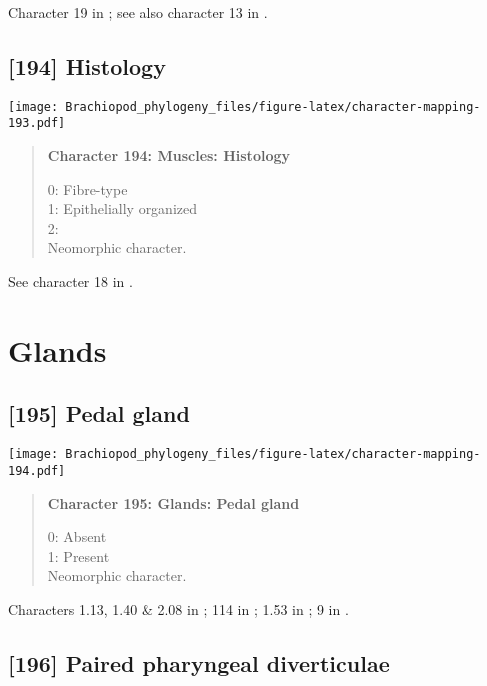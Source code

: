 \documentclass[openany]{book}
\theoremstyle{definition}
\theoremstyle{definition}
\theoremstyle{definition}
\theoremstyle{remark}
\begin{document}
Character 19 in \citet{Haszprunar1996}; see also character 13 in
\citet{Haszprunar2000}.

\subsection*{{[}194{]} Histology}\label{histology}

\texttt{[image: Brachiopod\_phylogeny\_files/figure-latex/character-mapping-193.pdf]}

\begin{quote}
\textbf{Character 194: Muscles: Histology}

0: Fibre-type\\
1: Epithelially organized\\
2:\\
Neomorphic character.
\end{quote}

See character 18 in \citet{Haszprunar1996}.

\section{Glands}\label{glands-1}

\subsection*{{[}195{]} Pedal gland}\label{pedal-gland}

\texttt{[image: Brachiopod\_phylogeny\_files/figure-latex/character-mapping-194.pdf]}

\begin{quote}
\textbf{Character 195: Glands: Pedal gland}

0: Absent\\
1: Present\\
Neomorphic character.
\end{quote}

Characters 1.13, 1.40 \& 2.08 in \citet{Scheltema1993}; 114 in
\citet{Giribet2002}; 1.53 in \citet{SPS1996}; 9 in
\citet{Haszprunar1996}.

\subsection*{{[}196{]} Paired pharyngeal
diverticulae}\label{paired-pharyngeal-diverticulae}
\end{document}
